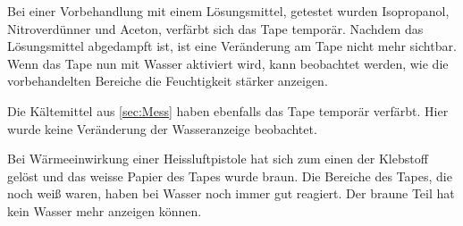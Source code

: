 

Bei einer Vorbehandlung mit einem Lösungsmittel, getestet wurden Isopropanol, Nitroverdünner und Aceton, verfärbt sich das Tape temporär. Nachdem das Lösungsmittel abgedampft ist, ist eine Veränderung am Tape nicht mehr sichtbar. Wenn das Tape nun mit Wasser aktiviert wird, kann beobachtet werden, wie die vorbehandelten Bereiche die Feuchtigkeit stärker anzeigen.

Die Kältemittel aus \ref{sec:Mess} haben ebenfalls das Tape temporär verfärbt. Hier wurde keine Veränderung der Wasseranzeige beobachtet.

Bei Wärmeeinwirkung einer Heissluftpistole hat sich zum einen der Klebstoff gelöst und das weisse Papier des Tapes wurde braun. Die Bereiche des Tapes, die noch weiß waren, haben bei Wasser noch immer gut reagiert. Der braune Teil hat kein Wasser mehr anzeigen können.
